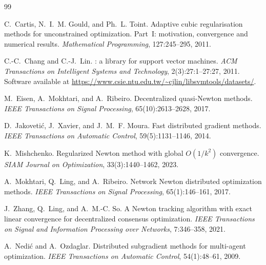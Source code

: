 \documentclass[review,onefignum,onetabnum]{siamart171218}
\begin{document}
	
	\begin{thebibliography}{99}
		
		C.~Cartis, N.~I.~M. Gould, and Ph.~L. Toint.
		\newblock Adaptive cubic regularisation methods for unconstrained optimization. Part~I: motivation, convergence and numerical results.
		\newblock \textit{Mathematical Programming}, 127:245--295, 2011.
		
		C.-C.~Chang and C.-J.~Lin.
		: a library for support vector machines.
		\newblock \textit{ACM Transactions on Intelligent Systems and Technology}, 2(3):27:1--27:27, 2011.
		\newblock Software available at \url{https://www.csie.ntu.edu.tw/~cjlin/libsvmtools/datasets/}.
		
		M.~Eisen, A.~Mokhtari, and A.~Ribeiro.
		\newblock Decentralized quasi-{N}ewton methods.
		\newblock \textit{IEEE Transactions on Signal Processing}, 65(10):2613--2628, 2017.
		
		D.~Jakoveti{\'c}, J.~Xavier, and J.~M.~F. Moura.
		\newblock Fast distributed gradient methods.
		\newblock \textit{IEEE Transactions on Automatic Control}, 59(5):1131--1146, 2014.
		
		K.~Mishchenko.
		\newblock Regularized {N}ewton method with global $O(1/k^2)$ convergence.
		\newblock \textit{SIAM Journal on Optimization}, 33(3):1440--1462, 2023.
		
		A.~Mokhtari, Q.~Ling, and A.~Ribeiro.
		\newblock Network {N}ewton distributed optimization methods.
		\newblock \textit{IEEE Transactions on Signal Processing}, 65(1):146--161, 2017.
		
		J.~Zhang, Q.~Ling, and A.~M.-C. So.
		\newblock A {N}ewton tracking algorithm with exact linear convergence for decentralized consensus optimization.
		\newblock \textit{IEEE Transactions on Signal and Information Processing over Networks}, 7:346--358, 2021.
		
		A.~Nedi{\'c} and A.~Ozdaglar.
		\newblock Distributed subgradient methods for multi-agent optimization.
		\newblock \textit{IEEE Transactions on Automatic Control}, 54(1):48--61, 2009.
		

\end{thebibliography}
\end{document}
